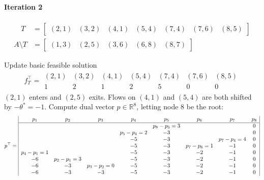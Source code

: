 \documentclass[11pt]{exam}
\begin{document}
\begin{questions}
\begin{parts}
        \paragraph{Iteration 2}
        \begin{align*}
            \quad T &= \begin{bmatrix}
                (2,1) & (3,2) & (4,1) & (5,4) & (7,4) & (7,6) & (8,5)
            \end{bmatrix}\\
            A\setminus T &= \begin{bmatrix}
                (1,3) & (2,5) & (3,6) & (6,8) & (8,7)
            \end{bmatrix}
        \end{align*}
        \begin{subparts}
            \subpart Update basic feasible solution
            \begin{align*}
                f_T^\top = \begin{array}{ccccccc}
                    (2,1) & (3,2) & (4,1) & (5,4) & (7,4) & (7,6) & (8,5)\\
                    \hline
                    1 & 2 & 1 & 2 & 5 & 0 & 0
                \end{array}
            \end{align*}
            $(2,1)$ enters and $(2,5)$ exits. Flows on $(4,1)$ and $(5,4)$ are both shifted by $-\theta^* = -1$.
            \subpart Compute dual vector $p \in \mathbb R^{8}$, letting node $8$ be the root:
            {\small \begin{align*}
                p^\top = 
                \begin{array}{|cccccccc|}
                  p_1 & p_2 & p_3 & p_4 & p_5 & p_6 & p_7 & p_8\\\hline
                      &     &     &     & p_8 - p_5 = 3 &     &     & 0\\
                      &     &     & p_5 - p_4 = 2 & -3 &     &     & 0\\
                      &     &     & -5 & -3 &     & p_7 - p_4 = 4 & 0\\
                      &     &     & -5 & -3 & p_7 - p_6 = 1 & -1 & 0\\
                  p_4 - p_1 = 1 &     &     & -5 & -3 & -2 & -1 & 0\\
                  -6  & p_2 - p_1 = 3 &     & -5 & -3 & -2 & -1 & 0\\
                  -6  & -3  & p_3 - p_2 = 0 & -5 & -3 & -2 & -1 & 0\\
                  -6  & -3  & -3  & -5 & -3 & -2 & -1 & 0\\
                \end{array}
              \end{align*}}


\end{subparts}
\end{parts}
\end{questions}
\end{document}
